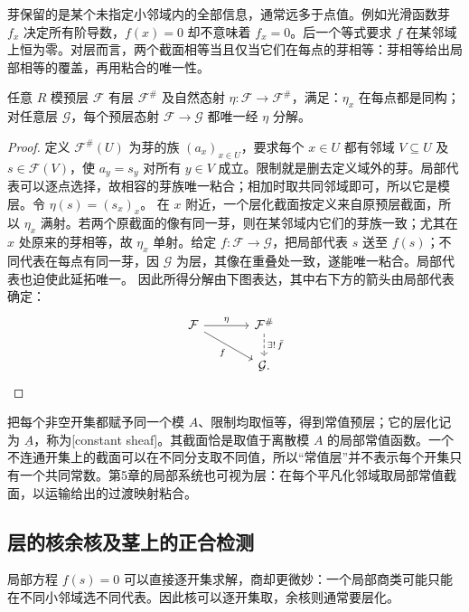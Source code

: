 芽保留的是某个未指定小邻域内的全部信息，通常远多于点值。例如光滑函数芽 \(f_x\) 决定所有阶导数，\(f(x)=0\) 却不意味着 \(f_x=0\)。后一个等式要求 \(f\) 在某邻域上恒为零。对层而言，两个截面相等当且仅当它们在每点的芽相等：芽相等给出局部相等的覆盖，再用粘合的唯一性。

\begin{proposition}\label{g2:prop:sheafification}
	任意 \(R\) 模预层 \(\mathcal F\) 有层 \(\mathcal F^{\#}\) 及自然态射 \(\eta:\mathcal F\to\mathcal F^{\#}\)，满足：\(\eta_x\) 在每点都是同构；对任意层 \(\mathcal G\)，每个预层态射 \(\mathcal F\to\mathcal G\) 都唯一经 \(\eta\) 分解。
\end{proposition}
\begin{proof}
	定义 \(\mathcal F^{\#}(U)\) 为芽的族 \((a_x)_{x\in U}\)，要求每个 \(x\in U\) 都有邻域 \(V\subseteq U\) 及 \(s\in\mathcal F(V)\)，使 \(a_y=s_y\) 对所有 \(y\in V\) 成立。限制就是删去定义域外的芽。局部代表可以逐点选择，故相容的芽族唯一粘合；相加时取共同邻域即可，所以它是模层。令 \(\eta(s)=(s_x)_x\)。
	在 \(x\) 附近，一个层化截面按定义来自原预层截面，所以 \(\eta_x\) 满射。若两个原截面的像有同一芽，则在某邻域内它们的芽族一致；尤其在 \(x\) 处原来的芽相等，故 \(\eta_x\) 单射。给定 \(f:\mathcal F\to\mathcal G\)，把局部代表 \(s\) 送至 \(f(s)\)；不同代表在每点有同一芽，因 \(\mathcal G\) 为层，其像在重叠处一致，遂能唯一粘合。局部代表也迫使此延拓唯一。
	因此所得分解由下图表达，其中右下方的箭头由局部代表确定：
	\[
		\begin{tikzcd}[column sep=large]
			\mathcal F \arrow[r,"\eta"] \arrow[dr,"f"'] & \mathcal F^{\#} \arrow[d,dashed,"\exists!\,\bar f"] \\
			& \mathcal G.
		\end{tikzcd}
	\]
\end{proof}

把每个非空开集都赋予同一个模 \(A\)、限制均取恒等，得到常值预层；它的层化记为 \(\underline A\)，称为[constant sheaf]。其截面恰是取值于离散模 \(A\) 的局部常值函数。一个不连通开集上的截面可以在不同分支取不同值，所以“常值层”并不表示每个开集只有一个共同常数。第5章的局部系统也可视为层：在每个平凡化邻域取局部常值截面，以运输给出的过渡映射粘合。

\subsection{层的核余核及茎上的正合检测}
\label{g2:subsec:0701:02}
局部方程 \(f(s)=0\) 可以直接逐开集求解，商却更微妙：一个局部商类可能只能在不同小邻域选不同代表。因此核可以逐开集取，余核则通常要层化。

